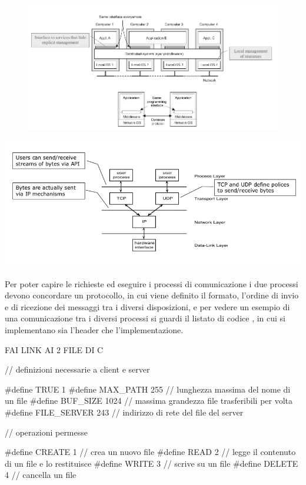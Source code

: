 \documentclass[a4paper,12pt, oneside]{book}
\begin{document}
\begin{figure}
\centering
\label{figura:interfaccia}
\includegraphics[scale=2]{img/cli4.png}
\end{figure}
\begin{center}
\includegraphics[scale=2]{img/cli5.png}
\end{center}
Per poter capire le richieste ed eseguire i processi di comunicazione i due processi devono concordare 
un protocollo, in cui viene definito il formato, l'ordine di invio e di ricezione dei messaggi tra 
i diversi disposizioni, e per vedere un esempio di una comunicazione tra i diversi processi si guardi
il listato di codice \href{listato:fileServer}, in cui si implementano sia l'header che l'implementazione.

FAI LINK AI 2 FILE DI C 

// definizioni necessarie a client e server 

#define TRUE 1
#define MAX_PATH 255 // lunghezza massima del nome di un file
#define BUF_SIZE 1024 // massima grandezza file trasferibili per volta
#define FILE_SERVER 243 // indirizzo di rete del file del server

// operazioni permesse 

#define CREATE 1 // crea un nuovo file
#define READ 2 // legge il contenuto di un file e lo restituisce
#define WRITE 3 // scrive su un file
#define DELETE 4 // cancella un file
\end{document}
